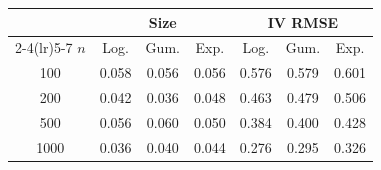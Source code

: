 \begin{tabular}{c ccc ccc}
\toprule
 & \multicolumn{3}{c}{Size} & \multicolumn{3}{c}{IV RMSE} \\
\cmidrule(lr){2-4}\cmidrule(lr){5-7}
$n$ & Log. & Gum. & Exp. & Log. & Gum. & Exp. \\
\midrule
100 & 0.058 & 0.056 & 0.056 & 0.576 & 0.579 & 0.601 \\
200 & 0.042 & 0.036 & 0.048 & 0.463 & 0.479 & 0.506 \\
500 & 0.056 & 0.060 & 0.050 & 0.384 & 0.400 & 0.428 \\
1000 & 0.036 & 0.040 & 0.044 & 0.276 & 0.295 & 0.326 \\
\bottomrule
\end{tabular}
